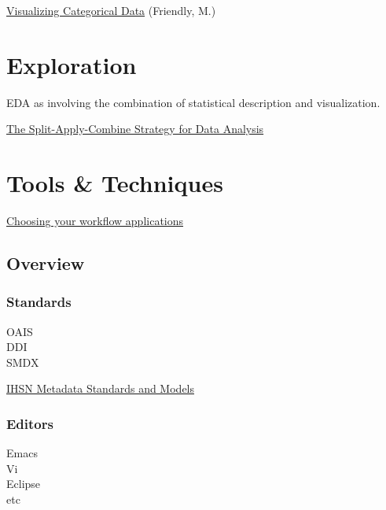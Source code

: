 \documentclass[reqno,12pt]{tufte-book}
\numberwithin{equation}{subsection}
\begin{document}
\href{http://www.datavis.ca/books/vcd/}{Visualizing Categorical Data} (Friendly, M.)

\part{Exploration}
\label{part:eda}

EDA as involving the combination of statistical description and visualization.

\href{http://www.jstatsoft.org/v40/i01}{The Split-Apply-Combine Strategy for Data Analysis}

\part{Tools \& Techniques}

\href{http://kieranhealy.org/files/misc/workflow-apps.pdf}{Choosing your workflow applications}

\chapter{Overview}

\section{Standards}
\label{sect:standards}

\begin{description}
\item [OAIS]
\item [DDI]
\item [SMDX]
\end{description}

\href{http://www.ihsn.org/HOME/node/135}{IHSN Metadata Standards and Models}

\section{Editors}
\label{sect:editors}

\begin{description}
\item [Emacs]
\item [Vi]
\item [Eclipse]
\item [etc]
\end{description}
\end{document}
